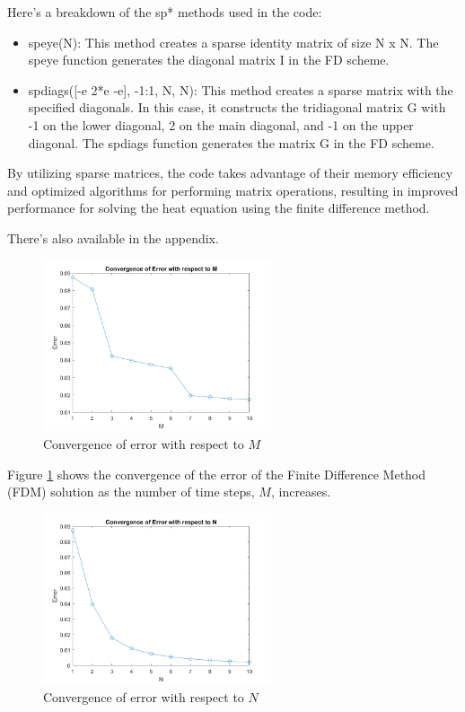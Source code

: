 Here's a breakdown of the sp* methods used in the code:

\begin{itemize}
    \item speye(N): This method creates a sparse identity matrix of size N x N. The speye function generates the diagonal matrix I in the FD scheme.
    \item spdiags([-e 2*e -e], -1:1, N, N): This method creates a sparse matrix with the specified diagonals. In this case, it constructs the tridiagonal matrix G with -1 on the lower diagonal, 2 on the main diagonal, and -1 on the upper diagonal. The spdiags function generates the matrix G in the FD scheme.
\end{itemize}

By utilizing sparse matrices, the code takes advantage of their memory efficiency and optimized algorithms for performing matrix operations, resulting in improved performance for solving the heat equation using the finite difference method.

There's also  available in the appendix.

\begin{figure}[H]
    \centering
    \includegraphics[width=0.6\textwidth]{pdes/fig/converge_error_m.png}
    \caption{Convergence of error with respect to $M$}
    \label{fig:converge_error_m}
\end{figure}

Figure \ref{fig:converge_error_m} shows the convergence of the error of the Finite Difference Method (FDM) solution as the number of time steps, $M$, increases.

\begin{figure}[H]
    \centering
    \includegraphics[width=0.6\textwidth]{pdes/fig/converge_error_n.png}
    \caption{Convergence of error with respect to $N$}
    \label{fig:converge_error_n}
\end{figure}


